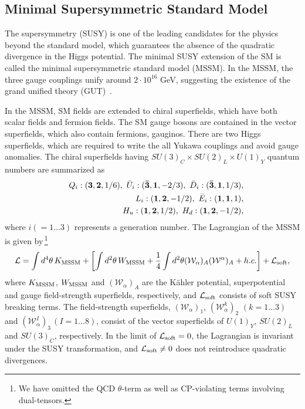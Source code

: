 \documentclass[preprint,3p,12pt]{elsarticle}
\begin{document}
\subsection{Minimal Supersymmetric Standard Model}
\label{sec:MSSM}

The supersymmetry (SUSY) is one of the leading candidates for the physics beyond the standard model, which guarantees the absence of the quadratic divergence in the Higgs potential. The minimal SUSY extension of the SM is called the minimal supersymmetric standard model (MSSM). In the MSSM, the three gauge couplings unify around $2\cdot 10^{16}$ GeV, suggesting the existence of the grand unified theory (GUT)~\cite{Georgi:1974sy, Pati:1974yy}.
 
In the MSSM, SM fields are extended to chiral superfields, which have both scalar fields and fermion fields. The SM gauge bosons are contained in the vector superfields, which also contain fermions, gauginos. There are two Higgs superfields, which are required to write the all %
Yukawa couplings and avoid gauge anomalies. The chiral superfields having $SU(3)_C \times SU(2)_L \times U(1)_Y$ quantum numbers are summarized as 
\begin{eqnarray}
&& Q_i: ({\bf 3}, {\bf 2},1/6), \ \bar U_i: ({\bf \bar 3}, {\bf 1}, -2/3), \  \bar D_i: ({\bf \bar 3}, {\bf 1}, 1/3),  \nonumber \\ 
&& L_i: ({\bf 1}, {\bf 2}, -1/2),  \ \bar E_i:({\bf 1},{\bf 1},1), \nonumber \\
&& H_u: ({\bf 1},{\bf 2},1/2), \ H_d:({\bf 1}, {\bf 2},-1/2),
\end{eqnarray}
where $i(=1 \dots 3)$ represents a generation number.
%
The Lagrangian of the MSSM is given by\,\footnote{
We have omitted the QCD $\theta$-term as well as CP-violating terms involving dual-tensors.
}
\begin{eqnarray}
\mathcal{L} = \int d^4 \theta \, K_{\rm MSSM}  + \left[ 
\int d^2 \theta \, W_{\rm MSSM}  + \frac{1}{4} \int d^2 \theta (\mathcal{W}_{\alpha})_A (\mathcal{W}^{\alpha})_A + h.c.
\right] + \mathcal{L}_{\rm soft},
\end{eqnarray}
where $K_{\rm MSSM}$, $W_{\rm MSSM}$ and $(\mathcal{W}_{\alpha})_A$
are the K{\" a}hler potential, superpotential and gauge field-strength superfields, respectively, 
and $\mathcal{L}_{\rm soft}$ consists of soft SUSY breaking terms. 
The field-strength superfields, $(\mathcal{W}_{\alpha})_1$, $(\mathcal{W}_{\alpha}^k)_2$ $(k=1\dots 3)$ and $(\mathcal{W}_{\alpha}^I)_3$\,$(I=1\dots 8)$, consist of the vector superfields of $U(1)_Y$, $SU(2)_L$ and $SU(3)_C$, respectively. 
In the limit of $\mathcal{L}_{\rm soft}=0$, the Lagrangian is invariant under the SUSY transformation, 
and $\mathcal{L}_{\rm soft} \neq 0$ does not reintroduce quadratic divergences.
%
\end{document}
